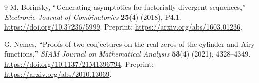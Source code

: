 \documentclass[11pt,a4paper]{article}
\theoremstyle{definition}
\numberwithin{equation}{section}
\begin{document}
\begin{thebibliography}{9}
M. Borinsky, ``Generating asymptotics for factorially divergent sequences,''
\emph{Electronic Journal of Combinatorics} \textbf{25}(4) (2018), P4.1.
\url{https://doi.org/10.37236/5999}.
Preprint: \url{https://arxiv.org/abs/1603.01236}.

G. Nemes, ``Proofs of two conjectures on the real zeros of the cylinder
and Airy functions,'' \emph{SIAM Journal on Mathematical Analysis}
\textbf{53}(4) (2021), 4328--4349.
\url{https://doi.org/10.1137/21M1396794}.
Preprint: \url{https://arxiv.org/abs/2010.13069}.

\end{thebibliography}
\end{document}
